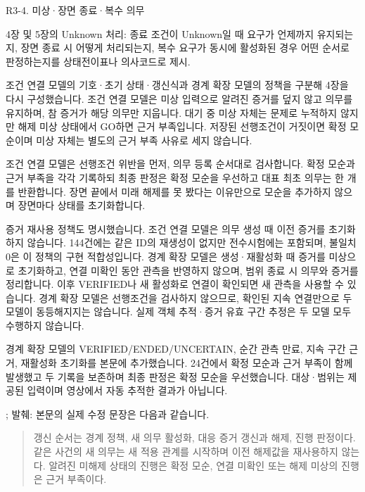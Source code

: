 \begin{reviewitem}{R3-4. 미상·장면 종료·복수 의무}

\begin{reviewercomment}

4장 및 5장의 Unknown 처리: 종료 조건이 Unknown일 때 요구가 언제까지 유지되는지, 장면 종료 시 어떻게 처리되는지, 복수 요구가 동시에 활성화된 경우 어떤 순서로 판정하는지를 상태전이표나 의사코드로 제시.

\end{reviewercomment}

\begin{authorresponse}

조건 연결 모델의 기호·초기 상태·갱신식과 경계 확장 모델의 정책을 구분해 4장을 다시 구성했습니다. 조건 연결 모델은 미상 입력으로 알려진 증거를 덮지 않고 의무를 유지하며, 참 증거가 해당 의무만 지웁니다. 대기 중 미상 자체는 문제로 누적하지 않지만 해제 미상 상태에서 GO하면 근거 부족입니다. 저장된 선행조건이 거짓이면 확정 모순이며 미상 자체는 별도의 근거 부족 사유로 세지 않습니다.

조건 연결 모델은 선행조건 위반을 먼저, 의무 등록 순서대로 검사합니다. 확정 모순과 근거 부족을 각각 기록하되 최종 판정은 확정 모순을 우선하고 대표 최초 의무는 한 개를 반환합니다. 장면 끝에서 미래 해제를 못 봤다는 이유만으로 모순을 추가하지 않으며 장면마다 상태를 초기화합니다.

증거 재사용 정책도 명시했습니다. 조건 연결 모델은 의무 생성 때 이전 증거를 초기화하지 않습니다. 144건에는 같은 ID의 재생성이 없지만 전수시험에는 포함되며, 불일치 0은 이 정책의 구현 적합성입니다. 경계 확장 모델은 생성·재활성화 때 증거를 미상으로 초기화하고, 연결 미확인 동안 관측을 반영하지 않으며, 범위 종료 시 의무와 증거를 정리합니다. 이후 VERIFIED나 새 활성화로 연결이 확인되면 새 관측을 사용할 수 있습니다. 경계 확장 모델은 선행조건을 검사하지 않으므로, 확인된 지속 연결만으로 두 모델이 동등해지지는 않습니다. 실제 객체 추적·증거 유효 구간 추정은 두 모델 모두 수행하지 않습니다.

경계 확장 모델의 VERIFIED/ENDED/UNCERTAIN, 순간 관측 만료, 지속 구간 근거, 재활성화 초기화를 본문에 추가했습니다. 24건에서 확정 모순과 근거 부족이 함께 발생했고 두 기록을 보존하며 최종 판정은 확정 모순을 우선했습니다. 대상·범위는 제공된 입력이며 영상에서 자동 추적한 결과가 아닙니다.

\end{authorresponse}

\begin{manuscriptrevision}{; 발췌: }
본문의 실제 수정 문장은 다음과 같습니다.

\begin{quote}
갱신 순서는 경계 정책, 새 의무 활성화, 대응 증거 갱신과 해제, 진행 판정이다. 같은 사건의 새 의무는 새 적용 관계를 시작하며 이전 해제값을 재사용하지 않는다. 알려진 미해제 상태의 진행은 확정 모순, 연결 미확인 또는 해제 미상의 진행은 근거 부족이다.
\end{quote}
\end{manuscriptrevision}

\end{reviewitem}

